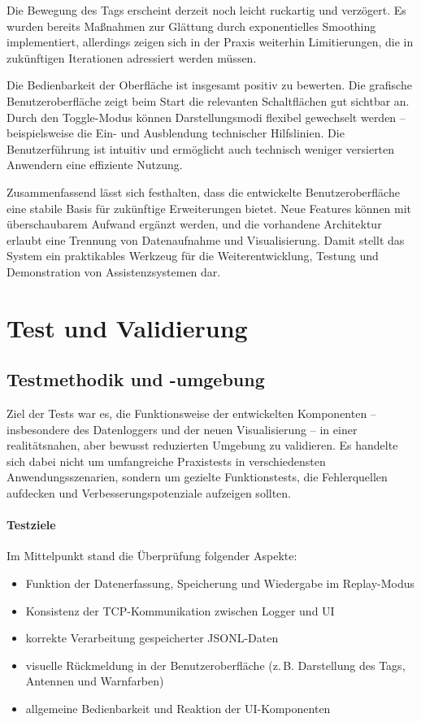 \documentclass[a4paper, 12pt]{article} %
\begin{document}
Die Bewegung des Tags erscheint derzeit noch leicht ruckartig und verzögert. Es wurden bereits Maßnahmen zur Glättung durch exponentielles Smoothing 
implementiert, allerdings zeigen sich in der Praxis weiterhin Limitierungen, die in zukünftigen Iterationen adressiert werden müssen.

Die Bedienbarkeit der Oberfläche ist insgesamt positiv zu bewerten. Die grafische Benutzeroberfläche zeigt beim Start die relevanten Schaltflächen gut 
sichtbar an. Durch den Toggle-Modus können Darstellungsmodi flexibel gewechselt werden – beispielsweise die Ein- und Ausblendung technischer Hilfslinien. 
Die Benutzerführung ist intuitiv und ermöglicht auch technisch weniger versierten Anwendern eine effiziente Nutzung.

Zusammenfassend lässt sich festhalten, dass die entwickelte Benutzeroberfläche eine stabile Basis für zukünftige Erweiterungen bietet. Neue Features 
können mit überschaubarem Aufwand ergänzt werden, und die vorhandene Architektur erlaubt eine Trennung von Datenaufnahme und Visualisierung. Damit stellt
 das System ein praktikables Werkzeug für die Weiterentwicklung, Testung und Demonstration von Assistenzsystemen dar.

 \clearpage

\section{Test und Validierung}
\subsection{Testmethodik und -umgebung}

Ziel der Tests war es, die Funktionsweise der entwickelten Komponenten -- insbesondere des Datenloggers und der neuen Visualisierung -- in einer 
realitätsnahen, aber bewusst reduzierten Umgebung zu validieren. Es handelte sich dabei nicht um umfangreiche Praxistests in verschiedensten 
Anwendungsszenarien, sondern um gezielte Funktionstests, die Fehlerquellen aufdecken und Verbesserungspotenziale aufzeigen sollten.

\paragraph{Testziele}
Im Mittelpunkt stand die Überprüfung folgender Aspekte:
\begin{itemize}
    \item Funktion der Datenerfassung, Speicherung und Wiedergabe im Replay-Modus
    \item Konsistenz der TCP-Kommunikation zwischen Logger und UI
    \item korrekte Verarbeitung gespeicherter JSONL-Daten
    \item visuelle Rückmeldung in der Benutzeroberfläche (z.\,B. Darstellung des Tags, Antennen und Warnfarben)
    \item allgemeine Bedienbarkeit und Reaktion der UI-Komponenten
\end{itemize}
\end{document}
